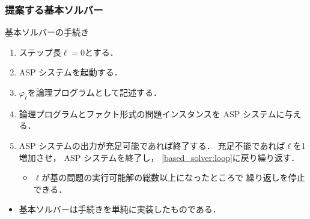 \documentclass[dvipdfmx,11pt]{beamer}
\begin{document}
\begin{frame}\frametitle{提案する基本ソルバー}

  \begin{block}{基本ソルバーの手続き}
    \centering
    \begin{enumerate}
      \item ステップ長$\ell=0$とする．
      \item ASP システムを起動する．
      \item $\varphi_{\ell}$を論理プログラムとして記述する． \label{based_solver:loop}
      \item 論理プログラムとファクト形式の問題インスタンスを
            ASP システムに与える．
      \item ASP システムの出力が充足可能であれば終了する．
            充足不能であれば$\ell$を1増加させ，
            ASP システムを終了し，
            \ref{based_solver:loop}に戻り繰り返す．
            \begin{itemize}
              \item $\ell$が基の問題の実行可能解の総数以上になったところで
                    繰り返しを停止できる．
            \end{itemize}
    \end{enumerate}
  \end{block}

  \begin{itemize}
    \item 基本ソルバーは手続きを単純に実装したものである．
  \end{itemize}

\end{frame}
\end{document}
